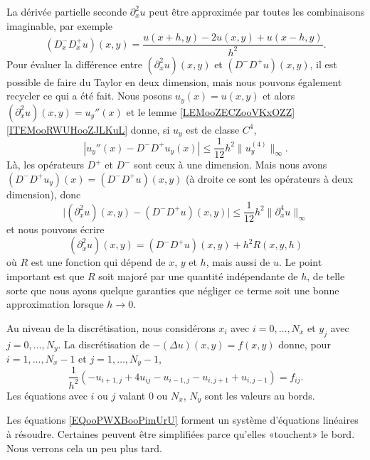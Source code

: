 La dérivée partielle seconde \( \partial^2_xu\) peut être approximée par toutes les combinaisons imaginable, par exemple
\begin{equation}
    (D^-_xD^+_xu)(x,y)=\frac{ u(x+h,y)-2u(x,y)+u(x-h,y) }{ h^2 }.
\end{equation}
Pour évaluer la différence entre \( (\partial^2_xu)(x,y)\) et \( (D^-D^+u)(x,y)\), il est possible de faire du Taylor en deux dimension, mais nous pouvons également recycler ce qui a été fait. Nous posons \( u_y(x)=u(x,y)\) et alors \( (\partial_x^2u)(x,y)=u_y''(x)\) et le lemme \ref{LEMooZECZooVKxOZZ}\ref{ITEMooRWUHooZJLKuL} donne, si \( u_y\) est de classe \( C^4\),
\begin{equation}
    | u_y''(x)-D^-D^+u_y(x) |\leq \frac{1}{ 12 }h^2\| u_y^{(4)} \|_{\infty}.
\end{equation}
Là, les opérateurs \( D^+\) et \( D^-\) sont ceux à une dimension. Mais nous avons \( (D^-D^+u_y)(x)=(D^-D^+u)(x,y)\) (à droite ce sont les opérateurs à deux dimension), donc
\begin{equation}
    \big| (\partial^2_xu)(x,y)-(D^-D^+u)(x,y) \big|\leq \frac{1}{ 12 }h^2\| \partial^4_xu \|_{\infty}
\end{equation}
et nous pouvons écrire
\begin{equation}
    (\partial^2_xu)(x,y)=(D^-D^+u)(x,y)+h^2R(x,y,h)
\end{equation}
où \( R\) est une fonction qui dépend de \( x\), \( y\) et \( h\), mais aussi de \( u\). Le point important est que \( R\) soit majoré par une quantité indépendante de \( h\), de telle sorte que nous ayons quelque garanties que négliger ce terme soit une bonne approximation lorsque \( h\to 0\).

Au niveau de la discrétisation, nous considérons \( x_i\) avec \( i=0,\ldots, N_x\) et \( y_j\) avec \( j=0,\ldots, N_y\). La discrétisation de \( -(\Delta u)(x,y)=f(x,y)\) donne, pour \( i=1,\ldots, N_x-1\) et \( j=1,\ldots, N_y-1\),
\begin{equation}        \label{EQooPWXBooPimUrU}
    \frac{1}{ h^2 }(-u_{i+1,j}+4u_{ij}-u_{i-1,j}-u_{i,j+1}+u_{i,j-1})=f_{ij}.
\end{equation}
Les équations avec \( i\) ou \( j\) valant \( 0\) ou \( N_x\), \( N_y\) sont les valeurs au bords.

Les équations \eqref{EQooPWXBooPimUrU} forment un système d'équations linéaires à résoudre. Certaines peuvent être simplifiées parce qu'elles «touchent» le bord. Nous verrons cela un peu plus tard.

